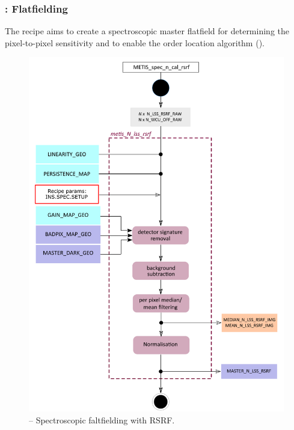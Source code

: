 \subsubsection{:  Flatfielding}\label{rec:metis_n_lss_rsrf}
The recipe  aims to create a spectroscopic master flatfield for determining the pixel-to-pixel sensitivity and to enable the order location algorithm ().
\begin{figure}[ht]
  \centering
  \includegraphics[width=0.5\textheight]{figures/metis_n_lss_rsrf_v0.84.pdf}
  \caption[Recipe: ]{ --
    Spectroscopic faltfielding with \ac{RSRF}.}
  \label{Fig:rec_n_lss_rsrf}
\end{figure}

